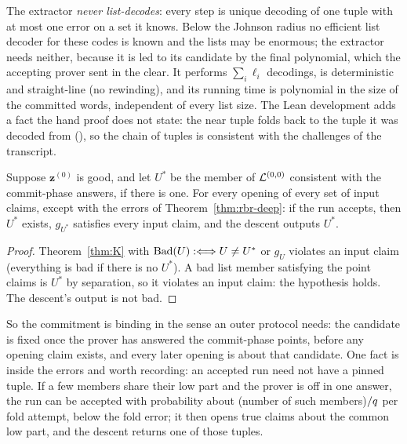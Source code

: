 The extractor \emph{never list-decodes}: every step is unique decoding of one tuple with at most one error on a set it knows. Below the Johnson radius no efficient list decoder for these codes is known and the lists may be enormous; the extractor needs neither, because it is led to its candidate by the final polynomial, which the accepting prover sent in the clear. It performs $\sum_i\ell_i$ decodings, is deterministic and straight-line (no rewinding), and its running time is polynomial in the size of the committed words, independent of every list size. The Lean development adds a fact the hand proof does not state: the near tuple folds back to the tuple it was decoded from (), so the chain of tuples is consistent with the challenges of the transcript.

\begin{corollary}\label{cor:K2}
Suppose $\mathbf z^{(0)}$ is good, and let $U^\ast$ be the member of $\mathcal{L}^{(0,0)}$ consistent with the commit-phase answers, if there is one. For every opening of every set of input claims, except with the errors of Theorem~\ref{thm:rbr-deep}: if the run accepts, then $U^\ast$ exists, $g_{U^\ast}$ satisfies every input claim, and the descent outputs $U^\ast$.
\end{corollary}
\begin{proof}
Theorem~\ref{thm:K} with $\mathrm{Bad}(U):\Longleftrightarrow U\ne U^\ast$ or $g_U$ violates an input claim (everything is bad if there is no $U^\ast$). A bad list member satisfying the point claims is $U^\ast$ by separation, so it violates an input claim: the hypothesis holds. The descent's output is not bad.
\end{proof}

So the commitment is binding in the sense an outer protocol needs: the candidate is fixed once the prover has answered the commit-phase points, before any opening claim exists, and every later opening is about that candidate. One fact is inside the errors and worth recording: an accepted run need not have a pinned tuple. If a few members share their low part and the prover is off in one answer, the run can be accepted with probability about (number of such members)$/q$ per fold attempt, below the fold error; it then opens true claims about the common low part, and the descent returns one of those tuples.


